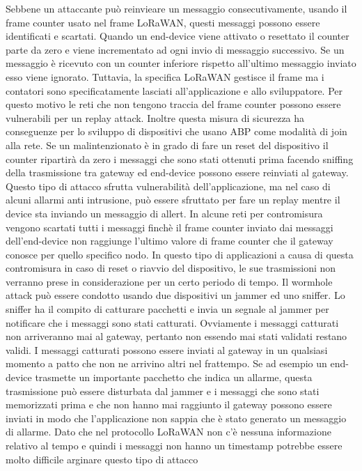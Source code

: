 \documentclass[12pt,a4paper,openright,twoside]{report}
\begin{document}
Sebbene un attaccante pu\`o reinvieare un messaggio consecutivamente, usando il frame counter usato nel frame LoRaWAN, questi messaggi possono essere identificati e scartati. Quando un end-device viene attivato o resettato il counter parte da zero e viene incrementato ad ogni invio di messaggio successivo. Se un messaggio \`e ricevuto con un counter inferiore rispetto all'ultimo messaggio inviato esso viene ignorato. Tuttavia, la specifica LoRaWAN gestisce il frame ma 
i contatori sono specificatamente lasciati all'applicazione e allo sviluppatore. Per questo motivo le reti che non tengono traccia del frame counter possono essere vulnerabili per un replay attack. Inoltre questa misura di sicurezza ha conseguenze per lo sviluppo di dispositivi che usano ABP come modalit\`a di join alla rete. Se un malintenzionato \`e in grado di fare un reset del dispositivo il counter ripartir\`a da zero i messaggi che sono stati ottenuti prima facendo sniffing della trasmissione tra gateway ed end-device possono essere reinviati al gateway. Questo tipo di attacco sfrutta vulnerabilit\`a dell'applicazione, ma nel caso di alcuni allarmi anti intrusione, pu\`o essere sfruttato per fare un replay mentre il device sta inviando un messaggio di allert. In alcune reti per contromisura vengono scartati tutti i messaggi finch\`e il frame counter inviato dai messaggi dell'end-device non raggiunge l'ultimo valore di frame counter che il gateway conosce per quello specifico nodo. In questo tipo di applicazioni a causa di questa contromisura in caso di reset o riavvio del dispositivo, le sue trasmissioni non verranno prese in considerazione per un certo periodo di tempo.       
Il wormhole attack pu\`o essere condotto usando due dispositivi un jammer ed uno sniffer. Lo sniffer ha il compito di catturare pacchetti e invia un segnale al jammer per notificare che i messaggi sono stati catturati. Ovviamente i messaggi catturati non arriveranno mai al gateway, pertanto non essendo mai stati validati restano validi. I messaggi catturati possono essere inviati al gateway in un qualsiasi momento a patto che non ne arrivino altri nel frattempo. Se ad esempio un end-device trasmette un importante pacchetto che indica un allarme, questa trasmissione pu\`o essere disturbata dal jammer e i messaggi che sono stati memorizzati prima e che non hanno mai raggiunto il gateway possono essere inviati in modo che l'applicazione non sappia che \`e stato generato un messaggio di allarme. 
Dato che nel protocollo LoRaWAN non c'\`e nessuna informazione relativo al tempo e quindi i messaggi non hanno un timestamp potrebbe essere molto difficile arginare questo tipo di attacco \cite{K24}
\end{document}
